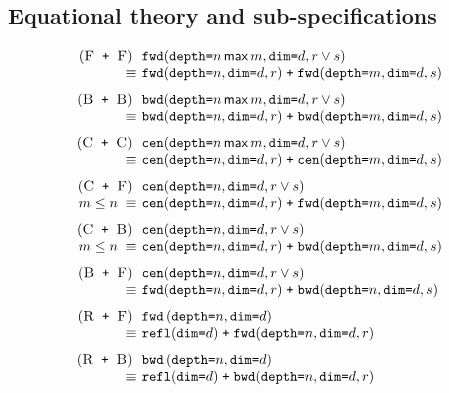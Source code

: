 \documentclass[9pt]{sigplanconf}
\theoremstyle{definition}
\newcommand{\term}[1]{\texttt{#1}}
\newcommand{\stenFwdS}[2]{\term{fwd} \, (\term{depth=}#1,
  \term{dim=}#2)}
\newcommand{\stenBwdS}[2]{\term{bwd} \, (\term{depth=}#1,
  \term{dim=}#2)}
\newcommand{\stenFwdSR}[3]{\term{fwd} (\term{depth=}#1,
  \term{dim=}#2, #3)}
\newcommand{\stenBwdSR}[3]{\term{bwd} (\term{depth=}#1,
  \term{dim=}#2, #3)}
\newcommand{\stenCenSR}[3]{\term{cen} (\term{depth=}#1,
  \term{dim=}#2, #3)}
\newcommand{\stenReflSR}[1]{\term{refl} (\term{dim=}#1)}
\begin{document}
\subsection{Equational theory and sub-specifications}
\label{sec:eqs}

\begin{figure}
\begin{align*}
\setlength{\arraycolsep}{0.05em}
\begin{array}{c}
\begin{array}{rll}
(\textsc{F\, \texttt{+} \,F}) \;\; &
\stenFwdSR{n \, \textsf{max} \, m}{d}{r \vee s} \\
 \equiv \; & \stenFwdSR{n}{d}{r} \; \texttt{+} \; \stenFwdSR{m}{d}{s} \\[0.7em]
%
%
(\textsc{B\, \texttt{+} \,B}) \;\; &
\stenBwdSR{n \, \textsf{max} \, m}{d}{r \vee s} \\
 \equiv \; & \stenBwdSR{n}{d}{r} \; \texttt{+} \; \stenBwdSR{m}{d}{s} \\[0.7em]
%
%
(\textsc{C\, \texttt{+} \,C}) \;\; &
\stenCenSR{n \, \textsf{max} \, m}{d}{r \vee s} \\
\equiv \; & \stenCenSR{n}{d}{r} \; \texttt{+} \; \stenCenSR{m}{d}{s} \\[0.7em]
%
%
(\textsc{C\, \texttt{+} \,F}) \;\; & \stenCenSR{n}{d}{r \vee s} \\
\textit{$m \leq n$} \; \equiv \; & \stenCenSR{n}{d}{r} \; \texttt{+} \;
                      \stenFwdSR{m}{d}{s} \\[0.7em]
%
%
(\textsc{C\, \texttt{+} \,B}) \;\; &
\stenCenSR{n}{d}{r \vee s} \\
\textit{$m \leq n$} \; \equiv \; & \stenCenSR{n}{d}{r} \; \texttt{+} \;
                      \stenBwdSR{m}{d}{s} \\[0.7em]
%
%
(\textsc{B\, \texttt{+} \,F}) \;\; &
\stenCenSR{n}{d}{r \vee s} \\
\equiv \; & \stenFwdSR{n}{d}{r} \; \texttt{+} \; \stenBwdSR{n}{d}{s}
  \\[0.7em]
%
%
(\textsc{R\, \texttt{+} \,F}) \;\; &
\stenFwdS{n}{d} \\
\equiv \; & \stenReflSR{d} \; \texttt{+} \; \stenFwdSR{n}{d}{r} \\[0.7em]
%
%
(\textsc{R\, \texttt{+} \,B}) \;\; &
\stenBwdS{n}{d} \\
\equiv \; & \stenReflSR{d} \; \texttt{+} \; \stenBwdSR{n}{d}{r} \\[0.7em]

\end{array}
\end{array}
\end{align*}
\end{figure}
\end{document}
